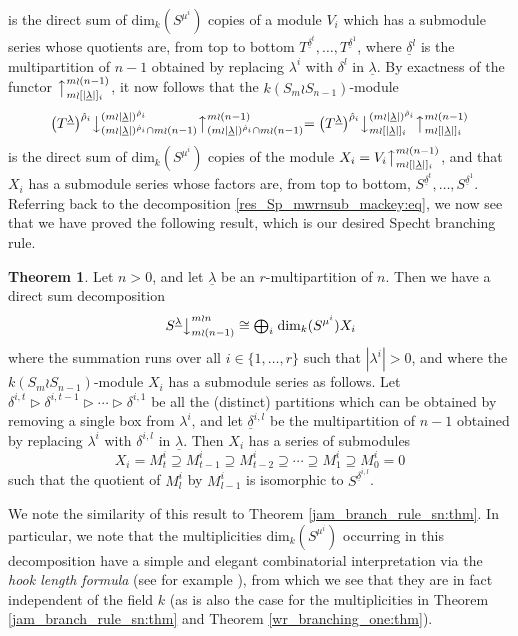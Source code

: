 \documentclass[10pt]{article}
\theoremstyle{definition}
\newtheorem{theo}[theorem]{Theorem}
\newcommand{\ul}[1]{\underline{#1}}
\begin{document}
is the direct sum of $\mathrm{dim}_k(S^{\mu^i})$ copies of a module $V_i$ which has a submodule series whose quotients are, from top to
bottom $T^{\ul{\delta}^t}, \ldots, T^{\ul{\delta}^1}$, where $\ul{\delta}^l$ is the multipartition of $n-1$ obtained by replacing $\lambda^i$
with $\delta^l$ in $\ul{\lambda}$. By exactness of the functor $\bigl\uparrow^{m \wr (n-1)}_{m \wr [|\ul{\lambda}|]_i}$, it now follows that the
$k(S_m \wr S_{n-1})$-module
\[
\bigl(T^{\ul{\lambda}}\bigr)^{\hat\rho_i}\bigl\downarrow^{(m{\wr}|\ul{\lambda}|)^{\hat\rho_i}}_{(m{\wr}|\ul{\lambda}|)^{\hat\rho_i} \cap m \wr (n-1)}
\bigl\uparrow^{m \wr (n-1)}_{(m{\wr}|\ul{\lambda}|)^{\hat\rho_i} \cap m \wr (n-1)}
=
\bigl(T^{\ul{\lambda}}\bigr)^{\hat\rho_i}\bigl\downarrow^{(m{\wr}|\ul{\lambda}|)^{\hat\rho_i}}_{m \wr [|\ul{\lambda}|]_i}
\bigl\uparrow^{m \wr (n-1)}_{m \wr [|\ul{\lambda}|]_i}
\]
is the direct sum of $\mathrm{dim}_k(S^{\mu^i})$ copies of the module $X_i = V_i\bigl\uparrow^{m \wr (n-1)}_{m \wr [|\ul{\lambda}|]_i}$, and that
$X_i$ has a submodule series whose factors are, from top to bottom, $S^{\ul{\delta}^t},\ldots,S^{\ul{\delta}^1}$.
Referring back to the decomposition \eqref{res_Sp_mwrnsub_mackey:eq}, we now see that we have proved the following result, which is our
desired Specht branching rule.

\begin{theo}
Let $n>0$, and let $\ul{\lambda}$ be an $r$-multipartition of $n$. Then we have a direct sum decomposition
\[\left.S^{\ul{\lambda}}\right\downarrow^{m \wr n}_{m \wr (n-1)} \cong {\textstyle \bigoplus_i}\;\mathrm{dim}_k(S^{\mu^i})X_i\]
where the summation runs over all $i \in \{1,\ldots,r\}$ such that $|\lambda^i| > 0$, and where the $k(S_m \wr S_{n-1})$-module $X_i$ has a
submodule series as follows. Let $\delta^{i,t} \triangleright \delta^{i,t-1} \triangleright \cdots \triangleright \delta^{i,1}$ be all the
(distinct) partitions which can be obtained by removing a single box from $\lambda^i$, and let $\ul{\delta}^{i,l}$ be the multipartition
of $n-1$ obtained by replacing $\lambda^i$ with $\delta^{i,l}$ in $\ul{\lambda}$. Then $X_i$ has a series of submodules
\[ X_i  = M^i_t \supseteq M^i_{t-1} \supseteq M^i_{t-2} \supseteq \cdots \supseteq M^i_1 \supseteq M^i_0 = 0 \]
such that the quotient of $M^i_l$ by $M^i_{l-1}$ is isomorphic to $S^{\ul{\delta}^{i,l}}$.
\end{theo}

We note the similarity of this result to Theorem \ref{jam_branch_rule_sn:thm}. In particular, we note that the multiplicities
$\mathrm{dim}_k(S^{\mu^i})$ occurring in this decomposition have a simple and elegant combinatorial interpretation via the
\textit{hook length formula} (see for example \cite[Chapter 20]{JAMSN}), from which we see that they are in fact independent of the field
$k$ (as is also the case for the multiplicities in Theorem \ref{jam_branch_rule_sn:thm} and Theorem \ref{wr_branching_one:thm}).
\end{document}

